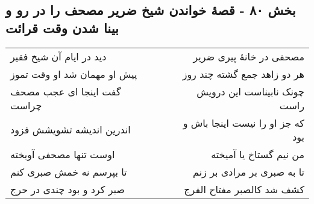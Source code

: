 \begin{center}
\section*{بخش ۸۰ - قصهٔ خواندن شیخ ضریر مصحف را در رو و بینا شدن وقت قرائت}
\label{sec:sh080}
\begin{longtable}{l p{0.5cm} r}
دید در ایام آن شیخ فقیر
&&
مصحفی در خانهٔ پیری ضریر
\\
پیش او مهمان شد او وقت تموز
&&
هر دو زاهد جمع گشته چند روز
\\
گفت اینجا ای عجب مصحف چراست
&&
چونک نابیناست این درویش راست
\\
اندرین اندیشه تشویشش فزود
&&
که جز او را نیست اینجا باش و بود
\\
اوست تنها مصحفی آویخته
&&
من نیم گستاخ یا آمیخته
\\
تا بپرسم نه خمش صبری کنم
&&
تا به صبری بر مرادی بر زنم
\\
صبر کرد و بود چندی در حرج
&&
کشف شد کالصبر مفتاح الفرج
\\
\end{longtable}
\end{center}

